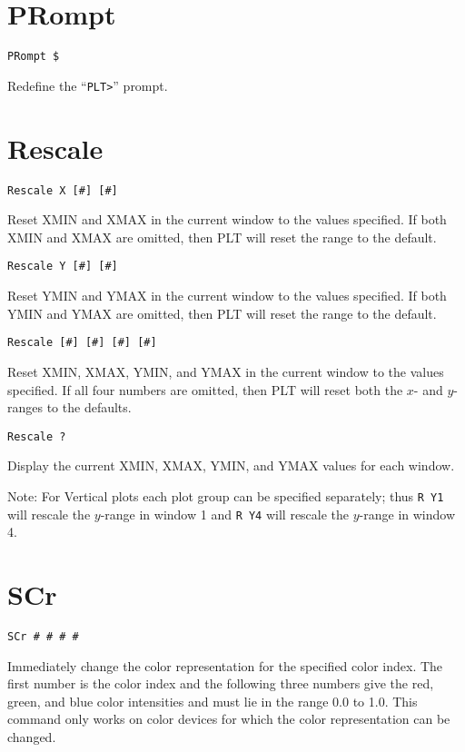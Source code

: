 \section*{PRompt}
\begin{verbatim}
PRompt $
\end{verbatim}
   Redefine the ``{\tt PLT>}'' prompt.

\section*{Rescale}
\begin{verbatim}
Rescale X [#] [#]
\end{verbatim}
   Reset XMIN and XMAX in the current window to the values specified.
If both XMIN and XMAX are omitted, then PLT will reset the range to
the default.

\medskip
\begin{verbatim}
Rescale Y [#] [#]
\end{verbatim}
   Reset YMIN and YMAX in the current window to the values specified.
If both YMIN and YMAX are omitted, then PLT will reset the range to
the default.

\medskip
\begin{verbatim}
Rescale [#] [#] [#] [#]
\end{verbatim}
   Reset XMIN, XMAX, YMIN, and YMAX in the current window to the values
specified.  If all four numbers are omitted, then PLT will reset both
the $x$- and $y$-ranges to the defaults.

\medskip
\begin{verbatim}
Rescale ?
\end{verbatim}
   Display the current XMIN, XMAX, YMIN, and YMAX values for each
window.  

Note:  For Vertical plots each plot group can be specified separately;
thus {\tt R~Y1} will rescale the $y$-range in window 1 and  {\tt R~Y4}
will rescale the $y$-range in window 4.  

\section*{SCr}
\begin{verbatim}
SCr # # # #
\end{verbatim}
   Immediately change the color representation for the specified color
index.  The first number is the color index and the following three
numbers give the red, green, and blue color intensities and must lie
in the range 0.0 to 1.0.  This command only works on color devices
for which the color representation can be changed.


